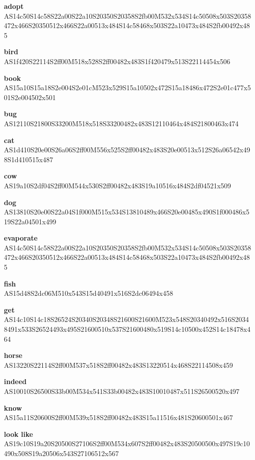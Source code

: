 \documentclass{article}
\begin{document}
\begin{glossary}

\textbf{adopt}\\
AS14c50S14c58S22a00S22a10S20350S20358S2fb00M532x534S14c50508x503S20358472x466S20350512x466S22a00513x484S14c58468x503S22a10473x484S2fb00492x485

\textbf{bird}\\
AS1f420S22114S2ff00M518x528S2ff00482x483S1f420479x513S22114454x506

\textbf{book}\\
AS15a10S15a18S2e004S2e01cM523x529S15a10502x472S15a18486x472S2e01c477x501S2e004502x501

\textbf{bug}\\
AS12110S21800S33200M518x518S33200482x483S12110464x484S21800463x474

\textbf{cat}\\
AS1d410S20e00S26a06S2ff00M556x525S2ff00482x483S20e00513x512S26a06542x498S1d410515x487

\textbf{cow}\\
AS19a10S2df04S2ff00M544x530S2ff00482x483S19a10516x484S2df04521x509

\textbf{dog}\\
AS13810S20e00S22a04S1f000M515x534S13810489x466S20e00485x490S1f000486x519S22a04501x499

\textbf{evaporate}\\
AS14c50S14c58S22a00S22a10S20350S20358S2fb00M532x534S14c50508x503S20358472x466S20350512x466S22a00513x484S14c58468x503S22a10473x484S2fb00492x485

\textbf{fish}\\
AS15d48S2dc06M510x543S15d40491x516S2dc06494x458

\textbf{get}\\
AS14c10S14c18S26524S20340S20348S21600S21600M523x548S20340492x516S20348491x533S26524493x495S21600510x537S21600480x519S14c10500x452S14c18478x464

\textbf{horse}\\
AS13220S22114S2ff00M537x518S2ff00482x483S13220514x468S22114508x459

\textbf{indeed}\\
AS10010S26500S33b00M534x541S33b00482x483S10010487x511S26500520x497

\textbf{know}\\
AS15a11S20600S2ff00M539x518S2ff00482x483S15a11516x481S20600501x467

\textbf{look like}\\
AS19c10S19a20S20500S27106S2ff00M534x607S2ff00482x483S20500500x497S19c10490x508S19a20506x543S27106512x567


\end{glossary}
\end{document}
